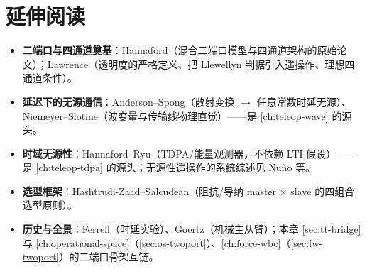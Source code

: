 \section*{延伸阅读}
\begin{itemize}
  \item \textbf{二端口与四通道奠基}：Hannaford\cite{hannaford1989design}（混合二端口模型与四通道架构的原始论文）；Lawrence\cite{lawrence1993stability}（透明度的严格定义、把 Llewellyn 判据引入遥操作、理想四通道条件）。
  \item \textbf{延迟下的无源通信}：Anderson--Spong\cite{anderson1989bilateral}（散射变换 $\to$ 任意常数时延无源）、Niemeyer--Slotine\cite{niemeyer1991stable}（波变量与传输线物理直觉）——是 \cref{ch:teleop-wave} 的源头。
  \item \textbf{时域无源性}：Hannaford--Ryu\cite{hannaford2002time}（TDPA/能量观测器，不依赖 LTI 假设）——是 \cref{ch:teleop-tdpa} 的源头；无源性遥操作的系统综述见 Nuño 等\cite{nuno2011passivity}。
  \item \textbf{选型框架}：Hashtrudi-Zaad--Salcudean\cite{hashtrudizaad2001analysis}（阻抗/导纳 master $\times$ slave 的四组合选型原则）。
  \item \textbf{历史与全景}：Ferrell\cite{ferrell1965remote}（时延实验）、Goertz\cite{goertz1954mechanical}（机械主从臂）；本章 \cref{sec:tt-bridge} 与 \cref{ch:operational-space}（\cref{sec:os-twoport}）、\cref{ch:force-wbc}（\cref{sec:fw-twoport}）的二端口骨架互链。
\end{itemize}
